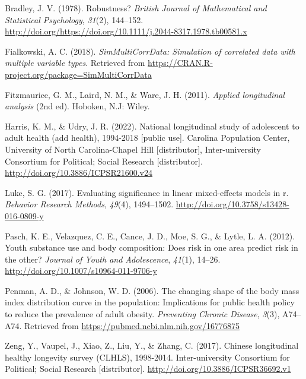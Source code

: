 \documentclass[12pt, twoside]{amherstthesis}
\begin{document}
\leavevmode\hypertarget{ref-bradley}{}%
Bradley, J. V. (1978). Robustness? \emph{British Journal of Mathematical and Statistical Psychology}, \emph{31}(2), 144--152. \url{http://doi.org/https://doi.org/10.1111/j.2044-8317.1978.tb00581.x}

\leavevmode\hypertarget{ref-Simtest}{}%
Fialkowski, A. C. (2018). \emph{SimMultiCorrData: Simulation of correlated data with multiple variable types}. Retrieved from \url{https://CRAN.R-project.org/package=SimMultiCorrData}

\leavevmode\hypertarget{ref-fitzmaurice_applied_2011}{}%
Fitzmaurice, G. M., Laird, N. M., \& Ware, J. H. (2011). \emph{Applied longitudinal analysis} (2nd ed). Hoboken, N.J: Wiley.

\leavevmode\hypertarget{ref-harris_national_2022}{}%
Harris, K. M., \& Udry, J. R. (2022). National longitudinal study of adolescent to adult health (add health), 1994-2018 {[}public use{]}. Carolina Population Center, University of North Carolina-Chapel Hill {[}distributor{]}, Inter-university Consortium for Political; Social Research {[}distributor{]}. \url{http://doi.org/10.3886/ICPSR21600.v24}

\leavevmode\hypertarget{ref-luke_evaluating_2017}{}%
Luke, S. G. (2017). Evaluating significance in linear mixed-effects models in r. \emph{Behavior Research Methods}, \emph{49}(4), 1494--1502. \url{http://doi.org/10.3758/s13428-016-0809-y}

\leavevmode\hypertarget{ref-pasch_youth_2012}{}%
Pasch, K. E., Velazquez, C. E., Cance, J. D., Moe, S. G., \& Lytle, L. A. (2012). Youth substance use and body composition: Does risk in one area predict risk in the other? \emph{Journal of Youth and Adolescence}, \emph{41}(1), 14--26. \url{http://doi.org/10.1007/s10964-011-9706-y}

\leavevmode\hypertarget{ref-penman_changing_2006}{}%
Penman, A. D., \& Johnson, W. D. (2006). The changing shape of the body mass index distribution curve in the population: Implications for public health policy to reduce the prevalence of adult obesity. \emph{Preventing Chronic Disease}, \emph{3}(3), A74--A74. Retrieved from \url{https://pubmed.ncbi.nlm.nih.gov/16776875}

\leavevmode\hypertarget{ref-zeng_chinese_2017}{}%
Zeng, Y., Vaupel, J., Xiao, Z., Liu, Y., \& Zhang, C. (2017). Chinese longitudinal healthy longevity survey (CLHLS), 1998-2014. Inter-university Consortium for Political; Social Research {[}distributor{]}. \url{http://doi.org/10.3886/ICPSR36692.v1}

\end{document}
